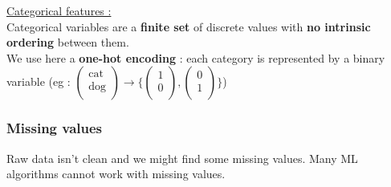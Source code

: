 \documentclass[../main.tex]{subfiles}
\begin{document}
\quad \underline{Categorical features :}\\
Categorical variables are a \textbf{finite set} of discrete values with \textbf{no intrinsic ordering} between them.\\
We use here a \textbf{one-hot encoding} : each category is represented by a binary variable (eg : $\begin{pmatrix}
    \text{cat}\\ \text{dog}\\
\end{pmatrix} \rightarrow \{ \begin{pmatrix}
    1 \\ 0 \\
\end{pmatrix}, \begin{pmatrix}
    0\\ 1\\
\end{pmatrix}\}$)\\

\subsubsection{Missing values}
Raw data isn't clean and we might find some missing values. Many ML algorithms cannot work with missing values.\\
\end{document}
